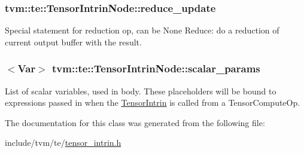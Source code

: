 \subsubsection[{\texorpdfstring{reduce\+\_\+update}{reduce_update}}]{ tvm\+::te\+::\+Tensor\+Intrin\+Node\+::reduce\+\_\+update}\hypertarget{classtvm_1_1te_1_1TensorIntrinNode_a8d4a891a69aec271eca1c57b16030755}{}\label{classtvm_1_1te_1_1TensorIntrinNode_a8d4a891a69aec271eca1c57b16030755}


Special statement for reduction op, can be None Reduce\+: do a reduction of current output buffer with the result. 

\subsubsection[{\texorpdfstring{scalar\+\_\+params}{scalar_params}}]{$<${\bf Var}$>$ tvm\+::te\+::\+Tensor\+Intrin\+Node\+::scalar\+\_\+params}\hypertarget{classtvm_1_1te_1_1TensorIntrinNode_a9bd674ec6c6a695ea81a3651e99a78f0}{}\label{classtvm_1_1te_1_1TensorIntrinNode_a9bd674ec6c6a695ea81a3651e99a78f0}


List of scalar variables, used in body. These placeholders will be bound to expressions passed in when the \hyperlink{classtvm_1_1te_1_1TensorIntrin}{Tensor\+Intrin} is called from a Tensor\+Compute\+Op. 



The documentation for this class was generated from the following file\+:\begin{DoxyCompactItemize}
\item 
include/tvm/te/\hyperlink{tensor__intrin_8h}{tensor\+\_\+intrin.\+h}\end{DoxyCompactItemize}

